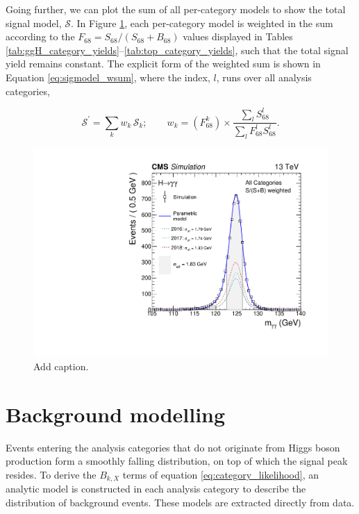 Going further, we can plot the sum of all per-category models to show the total signal model, $\mathcal{S}$. In Figure \ref{fig:sigmodels_weighted}, each per-category model is weighted in the sum according to the $F_{68} = S_{68}/(S_{68}+B_{68})$ values displayed in Tables \ref{tab:ggH_category_yields}--\ref{tab:top_category_yields}, such that the total signal yield remains constant. The explicit form of the weighted sum is shown in Equation \ref{eq:sigmodel_wsum}, where the index, $l$, runs over all analysis categories,

\begin{equation}\label{eq:sigmodel_wsum}
    \mathcal{S}^' = \sum_k w_k\,\mathcal{S}_k; \qquad w_k = (F^k_{68}) \times \frac{\sum_l S^l_{68}}{\sum_l F^l_{68} S^l_{68}}.
\end{equation}

\begin{figure}[hptb]
  \centering
  \includegraphics[width=.8\textwidth]{Figures/hgg_stats/smodel_all_weight.pdf}
  \caption[Weighted sum of all signal models]
  {
    Add caption.
  }
  \label{fig:sigmodels_weighted}
\end{figure}

\section{Background modelling}\label{sec:bkg_modeling}
Events entering the analysis categories that do not originate from Higgs boson production form a smoothly falling \mgg distribution, on top of which the signal peak resides. To derive the $B_{k,X}$ terms of equation \ref{eq:category_likelihood}, an analytic model is constructed in each analysis category to describe the distribution of background events. These models are extracted directly from data.

